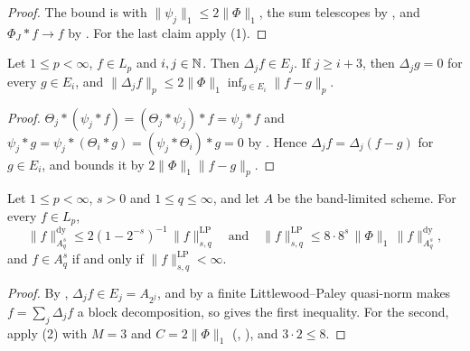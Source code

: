 \begin{proof}
\leanok
The bound is  with $\|\psi_j\|_1 \leq 2 \|\Phi\|_1$, the sum telescopes by
, and $\Phi_J * f \to f$ by . For the last
claim apply (1).
\end{proof}

\begin{lemma}
\label{lem:lp-blocks-band}
\leanok
{}
Let $1 \leq p < \infty$, $f \in L_p$ and $i, j \in \mathbb{N}$. Then $\Delta_j f \in E_j$. If
$j \geq i + 3$, then $\Delta_j g = 0$ for every $g \in E_i$, and
$\|\Delta_j f\|_p \leq 2 \|\Phi\|_1 \inf_{g \in E_i} \|f - g\|_p$.
\end{lemma}

\begin{proof}
\leanok
$\Theta_j * (\psi_j * f) = (\Theta_j * \psi_j) * f = \psi_j * f$ and
$\psi_j * g = \psi_j * (\Theta_i * g) = (\psi_j * \Theta_i) * g = 0$ by
. Hence $\Delta_j f = \Delta_j (f - g)$ for $g \in E_i$, and
 bounds it by $2 \|\Phi\|_1 \|f - g\|_p$.
\end{proof}

\begin{theorem}
\label{thm:lp-band}
\leanok
{}
Let $1 \leq p < \infty$, $s > 0$ and $1 \leq q \leq \infty$, and let $A$ be the band-limited
scheme. For every $f \in L_p$,
\[
  \|f\|^{\mathrm{dy}}_{A^s_q} \leq 2 (1 - 2^{-s})^{-1} \, \|f\|^{\mathrm{LP}}_{s,q}
  \quad \text{and} \quad
  \|f\|^{\mathrm{LP}}_{s,q} \leq 8 \cdot 8^s \, \|\Phi\|_1 \, \|f\|^{\mathrm{dy}}_{A^s_q},
\]
and $f \in A^s_q$ if and only if $\|f\|^{\mathrm{LP}}_{s,q} < \infty$.
\end{theorem}

\begin{proof}
\leanok
By , $\Delta_j f \in E_j = A_{2^j}$, and by  a
finite Littlewood--Paley quasi-norm makes $f = \sum_j \Delta_j f$ a block decomposition, so
 gives the first inequality. For the second, apply
(2) with $M = 3$ and $C = 2\|\Phi\|_1$ (,
), and $3 \cdot 2 \leq 8$.
\end{proof}

